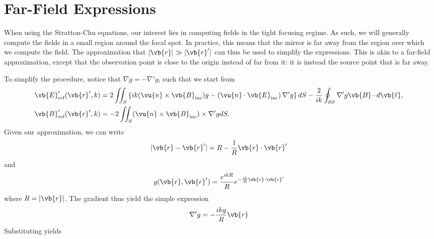 \documentclass[11pt,SymmetricalJury]{inrsthesis/inrsthesis}
\begin{document}
\section{Far-Field Expressions}

When using the Stratton-Chu equations, our interest lies in computing fields
in the tight focusing regime. As such, we will generally compute the fields
in a small region around the focal spot. In practice, this means that the mirror
is far away from the region over which we compute the field­. The approximation
that $|\vb{r}|\gg|\vb{r}'|$ can thus be used to simplify the expressions.
This is akin to a far-field approximation, except that the observation point is
close to the origin instead of far from it: it is instead the source point that
is far away.

To simplify the procedure, notice that $\nabla g = -\nabla' g$, such that we
start from
  \begin{subequations}
  \begin{align}
    \vb{E}'_\text{ref}(\vb{r}',k)  &= 2\iint_S
      \left\{
        ik(\vu{n}\times\vb{B}_\text{inc})g
        -\left(\vu{n}\cdot\vb{E}_\text{inc}\right)\nabla' g\right\}dS
        -\frac{2}{ik}\oint_{\partial S}\nabla' g
                    \vb{B}\cdot d\vb{\ell},\\
    \vb{B}'_\text{ref}(\vb{r}',k)  &= -2\iint_S (\vu{n}\times\vb{B}_\text{inc})\times\nabla' g dS.
  \end{align}
  \end{subequations}
Given our approximation, we can write
  \begin{equation}
    |\vb{r}-\vb{r}'| = R-\frac{1}{R}\vb{r}\cdot\vb{r}'
  \end{equation}
and
  \begin{equation}
    g(\vb{r},\vb{r}') = \frac{e^{ikR}}{R}e^{-\frac{ik}{R}\vb{r}\cdot\vb{r}'}
  \end{equation}
where $R=|\vb{r}|$. The gradient thus yield the simple expression
  \begin{equation}
    \nabla'g = -\frac{ikg}{R}\vb{r}
  \end{equation}
Substituting yields
\end{document}
